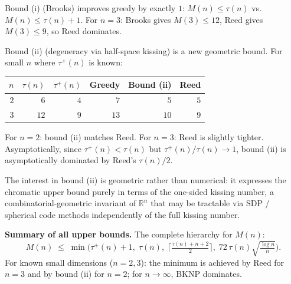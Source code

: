 \begin{remark}
Bound (i) (Brooks) improves greedy by exactly $1$: $M(n)\le\tau(n)$ vs.\ $M(n)\le\tau(n)+1$.  For $n=3$: Brooks gives $M(3)\le 12$, Reed gives $M(3)\le 9$, so Reed dominates.

Bound (ii) (degeneracy via half-space kissing) is a new geometric bound.  For small $n$ where $\tau^+(n)$ is known:
\smallskip
\begin{center}
\begin{tabular}{r|r|r|r|r|r}
$n$ & $\tau(n)$ & $\tau^+(n)$ & Greedy & \textup{Bound (ii)} & Reed \\
\hline
$2$ & $6$ & $4$ & $7$ & $5$ & $5$ \\
$3$ & $12$ & $9$ & $13$ & $10$ & $9$ \\
\end{tabular}
\end{center}
\smallskip
For $n=2$: bound (ii) matches Reed.  For $n=3$: Reed is slightly tighter.  Asymptotically, since $\tau^+(n)<\tau(n)$ but $\tau^+(n)/\tau(n)\to 1$, bound (ii) is asymptotically dominated by Reed's $\tau(n)/2$.

The interest in bound (ii) is geometric rather than numerical: it expresses the chromatic upper bound purely in terms of the one-sided kissing number, a combinatorial-geometric invariant of $\mathbb{R}^n$ that may be tractable via SDP / spherical code methods independently of the full kissing number.
\end{remark}

\medskip
\textbf{Summary of all upper bounds.}  The complete hierarchy for $M(n)$:
\[
  M(n)\;\le\;\min\bigl(\tau^+(n)+1,\;\tau(n),\;\lceil\tfrac{\tau(n)+n+2}{2}\rceil,\;72\,\tau(n)\sqrt{\tfrac{\log n}{n}}\bigr).
\]
For known small dimensions ($n=2,3$): the minimum is achieved by Reed for $n=3$ and by bound (ii) for $n=2$; for $n\to\infty$, BKNP dominates.

